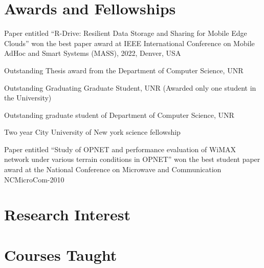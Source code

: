 \documentclass[11pt,letterpaper,sans]{moderncv}   %
\begin{document}


\section{Awards and Fellowships}
	{Paper entitled ``R-Drive: Resilient Data Storage and Sharing for Mobile Edge Clouds''  won the best paper award at IEEE International Conference on Mobile AdHoc and Smart Systems (MASS), 2022, Denver, USA}

	{Outstanding Thesis award from the Department of Computer Science, UNR}

	{Outstanding Graduating Graduate Student, UNR (Awarded only one student in the University)}

	{Outstanding graduate student of Department of Computer Science, UNR}

	{Two year City University of New york science fellowship}

	{Paper entitled ``Study of OPNET and performance evaluation of WiMAX network under various terrain conditions in OPNET'' won the best student paper award at the National
Conference on Microwave and Communication NCMicroCom-2010}



\section{Research Interest}



\section{Courses Taught }
\end{document}
